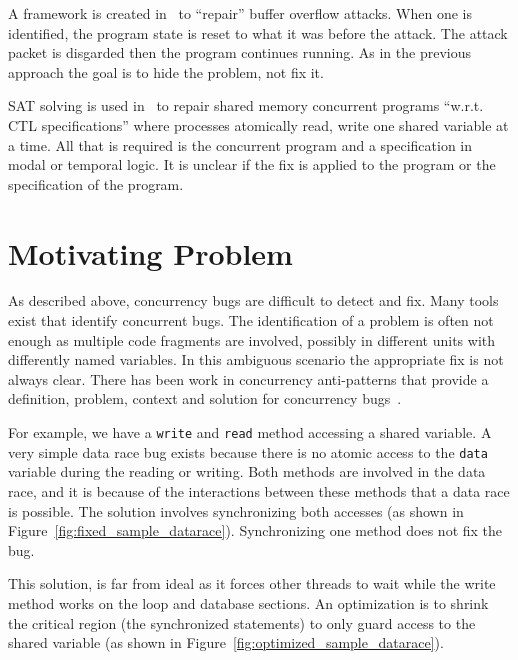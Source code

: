 \documentclass[10pt, conference, compsocconf]{IEEEtran}
\begin{document}
A framework is created in~\cite{CB05} to ``repair'' buffer overflow attacks.
When one is identified, the program state is reset to what it was before the
attack. The attack packet is disgarded then the program continues running. As
in the previous approach the goal is to hide the problem, not fix it.

SAT solving is used in~\cite{AY07}  to repair shared memory concurrent programs
``w.r.t. CTL specifications'' where processes atomically read, write one shared
variable at a time. All that is required is the concurrent program and a
specification in modal or temporal logic. It is unclear if the fix is applied
to the program or the specification of the program.

\section{Motivating Problem}
\label{sec:motivation}

As described above, concurrency bugs are difficult to detect and fix. Many
tools exist that identify concurrent bugs. The identification of a problem is
often not enough as multiple code fragments are involved, possibly in different
units with differently named variables. In this ambiguous scenario the 
appropriate fix is not always clear. There has been work in concurrency 
anti-patterns that provide a definition, problem, context and solution for 
concurrency bugs~\cite{BJ09}.

For example, we have a \texttt{write} and \texttt{read} method accessing a
shared variable. A very simple data race bug exists because there is no atomic
access to the \texttt{data} variable during the reading or writing. Both
methods are involved in the data race, and it is because of the interactions 
between these methods that a data race is possible. The solution involves 
synchronizing both accesses (as shown in Figure~\ref{fig:fixed_sample_datarace}). 
Synchronizing one method does not fix the bug.

This solution, is far from ideal as it forces other threads to wait while the
write method works on the loop and database sections. An optimization is to
shrink the critical region (the synchronized statements) to only guard access
to the shared variable (as shown in
Figure~\ref{fig:optimized_sample_datarace}).
\end{document}
